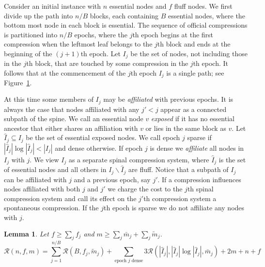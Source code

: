 \documentclass{article}
\newtheorem{lemma}[theorem]{Lemma}
\newcommand{\mup}{\bar{m}}
\newcommand{\mdown}{\tilde{m}}
\newcommand{\Rec}{\mathscr{R}}
\begin{document}
Consider an initial instance with $n$ essential nodes and $f$ fluff nodes.  We first divide up the path
into $n/B$ blocks, each containing $B$ essential nodes, where the bottom most node in each block
is essential.  The sequence of official compressions is partitioned into $n/B$ epochs, where the $j$th epoch
begins at the first compression when the leftmost leaf belongs to the $j$th block and ends 
at the beginning of the $(j+1)$th epoch.  Let $I_j$ be the set of nodes, not including those in the $j$th block, that are touched by some compression
in the $j$th epoch.  It follows that at the commencement of the $j$th epoch $I_j$ is a single path; see Figure~\ref{fig:Ij}.
\begin{figure}[h!]
\begin{center}
\end{center}
\caption{\label{fig:Ij}}
\end{figure}
At this time some members of $I_j$ may be {\em affiliated}
with previous epochs.  It is always the case that nodes affiliated with any $j' < j$ appear as a connected subpath of the spine.
We call an essential node $v$ {\em exposed} if it has no essential ancestor that either shares an affiliation with $v$ or lies
in the same block as $v$.
Let $\hat{I}_j\subseteq I_j$ be the set of essential exposed nodes.  
We call epoch $j$ sparse 
if $|\hat{I}_j|\log|\hat{I}_j| < |I_j|$ and dense otherwise.  
If epoch $j$ is dense we {\em affiliate} all nodes in $I_j$ with $j$.
We view $I_j$ as a separate spinal compression system, where $\hat{I}_j$ is the set of essential nodes and all others in $I_j\backslash \hat{I}_j$ 
are fluff.  Notice that a subpath of $I_j$ can be affiliated with $j$ and a previous epoch, say $j'$.  If a compression
influences nodes affiliated with both $j$ and $j'$ we charge the cost to the $j$th spinal compression system and call its effect
on the $j'$th compression system a spontaneous compression.
If the $j$th epoch is sparse we do not affiliate any nodes with $j$.

\begin{lemma}\label{lem:rec-a}
Let $f \ge \sum_j f_j$ and $m \ge \sum_j \mup_j + \sum_j \mdown_j$.
\[
\Rec(n,f,m) = \sum_{j=1}^{n/B} \Rec(B,f_j,\mdown_j) + \sum_{\mbox{epoch $j$ dense}} 3\Rec(|\hat{I}_j|, |\hat{I}_j|\log|\hat{I}_j|, \mup_j) + 2m + n + f
\]
\end{lemma}
\end{document}
